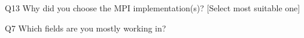 \begin{description}%
\item{Q13} Why did you choose the MPI implementation(s)? [Select most suitable one]%
\item{Q7} Which fields are you mostly working in?%
\end{description}%
